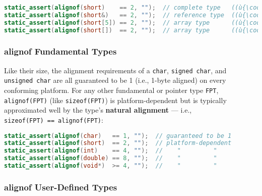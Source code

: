 \begin{lstlisting}[language=C++]
static_assert(alignof(short)    == 2, "");  // complete type   ((ù{\codeincomments{sizeof}}ù) is 2)
static_assert(alignof(short&)   == 2, "");  // reference type  ((ù{\codeincomments{sizeof}}ù) is 2)
static_assert(alignof(short[5]) == 2, "");  // array type      ((ù{\codeincomments{sizeof}}ù) is 2)
static_assert(alignof(short[])  == 2, "");  // array type      ((ù{\codeincomments{sizeof}}ù) fails)
\end{lstlisting}
    

\subsubsection[\tt{alignof} Fundamental Types]{{\SubsubsecCode alignof} Fundamental Types}\label{alignof-fundamental-types}

Like their size, the alignment requirements of a \texttt{char},
\texttt{signed}~\texttt{char}, and \texttt{unsigned}~\texttt{char} are
all guaranteed to be 1 (i.e., 1-byte aligned) on every conforming
platform. For any other fundamental or pointer type \texttt{FPT},
\texttt{alignof(FPT)} (like \texttt{sizeof(FPT)}) is platform-dependent but is typically approximated well by the type's \textbf{natural
alignment} --- i.e.,
\texttt{sizeof(FPT)}~\texttt{==}~\texttt{alignof(FPT)}:

\begin{lstlisting}[language=C++]
static_assert(alignof(char)   == 1, "");  // guaranteed to be 1
static_assert(alignof(short)  == 2, "");  // platform-dependent
static_assert(alignof(int)    == 4, "");  //    "         "
static_assert(alignof(double) == 8, "");  //    "         "
static_assert(alignof(void*)  >= 4, "");  //    "         "
\end{lstlisting}
    

\subsubsection[\tt{alignof} User-Defined Types]{{\SubsubsecCode alignof} User-Defined Types}\label{alignof-user-defined-types}

